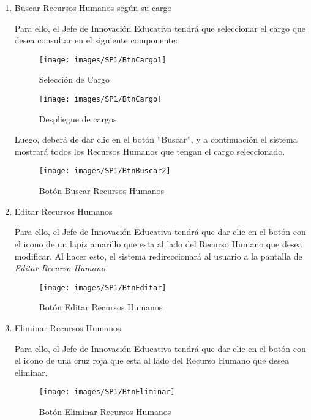 \begin{enumerate}
	\item Buscar Recursos Humanos según su cargo

	Para ello, el Jefe de Innovación Educativa tendrá que seleccionar el cargo que desea consultar en el siguiente componente:
	\begin{figure}[!hbtp]
		\centering
		\hypertarget{cargo1}{\texttt{[image: images/SP1/BtnCargo1]}}
		\caption{Selección de Cargo}
		\label{cargo1}
	\end{figure}

	\begin{figure}[!hbtp]
		\centering
		\hypertarget{cargo}{\texttt{[image: images/SP1/BtnCargo]}}
		\caption{Despliegue de cargos}
		\label{cargo}
	\end{figure}

	Luego, deberá de dar clic en el botón ''Buscar'', y a continuación el sistema mostrará todos los Recursos Humanos que tengan el cargo seleccionado.
	\begin{figure}[!hbtp]
		\centering
		\hypertarget{buscar}{\texttt{[image: images/SP1/BtnBuscar2]}}
		\caption{Botón Buscar Recursos Humanos}
		\label{buscar}
	\end{figure}

	\item Editar Recursos Humanos

	Para ello, el Jefe de Innovación Educativa tendrá que dar clic en el botón con el icono de un lapiz amarillo que esta al lado del Recurso Humano que desea modificar. Al hacer esto, el sistema redireccionará al usuario a la pantalla de \hyperlink{editarrh}{\textit{Editar Recurso Humano}}.
	\begin{figure}[!hbtp]
		\centering
		\hypertarget{editar}{\texttt{[image: images/SP1/BtnEditar]}}
		\caption{Botón Editar Recursos Humanos}
		\label{editar}
	\end{figure}
	\newpage
	\item Eliminar Recursos Humanos

	Para ello, el Jefe de Innovación Educativa tendrá que dar clic en el botón con el icono de una cruz roja que esta al lado del Recurso Humano que desea eliminar. 

	\begin{figure}[!hbtp]
		\centering
		\hypertarget{eliminar}{\texttt{[image: images/SP1/BtnEliminar]}}
		\caption{Botón Eliminar Recursos Humanos}
		\label{eliminar}
	\end{figure}


\end{enumerate}
